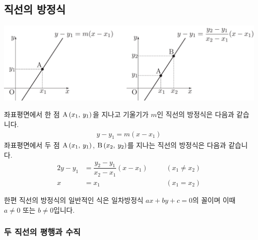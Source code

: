 \subsection{직선의 방정식}
\begin{center}
\includegraphics[scale=0.125]{pic0/pic147.pdf}
\end{center}좌표평면에서 한 점 $\xy[A]{x_1}{y_1}$을 지나고 기울기가 $m$인 직선의 방정식은 다음과 같습니다. \begin{align*}y-y_1 = m (x-x_1)\end{align*}
좌표평면에서 두 점 $\xy[A]{x_1}{y_1}$, $\xy[B]{x_2}{y_2}$를 지나는 직선의 방정식은 다음과 같습니다.
\begin{alignat*}{2}
  y-y_1 &= \dfrac{y_2-y_1}{x_2-x_1}(x-x_1) \quad &&(x_1 \ne x_2)\\
  x&=x_1 \quad &&(x_1 = x_2)
\end{alignat*}

한편 직선의 방정식의 일반적인 식은 일차방정식 $ax+by+c=0$의 꼴이며 이때 $a\ne0$ 또는 $b\ne0$입니다.
\subsubsection{두 직선의 평행과 수직}

